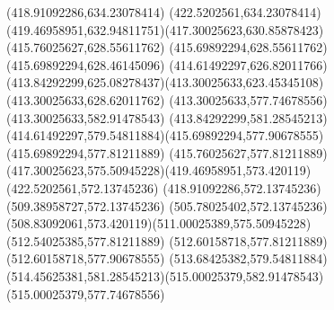 {{	\closepath
	\moveto(418.91092286,634.23078414)
	\lineto(422.5202561,634.23078414)
	\curveto(419.46958951,632.94811751)(417.30025623,630.85878423)(415.76025627,628.55611762)
	\lineto(415.69892294,628.55611762)
	\lineto(415.69892294,628.46145096)
	\curveto(414.61492297,626.82011766)(413.84292299,625.08278437)(413.30025633,623.45345108)
	\lineto(413.30025633,628.62011762)
	\closepath
	\moveto(413.30025633,577.74678556)
	\lineto(413.30025633,582.91478543)
	\curveto(413.84292299,581.28545213)(414.61492297,579.54811884)(415.69892294,577.90678555)
	\lineto(415.69892294,577.81211889)
	\lineto(415.76025627,577.81211889)
	\curveto(417.30025623,575.50945228)(419.46958951,573.420119)(422.5202561,572.13745236)
	\lineto(418.91092286,572.13745236)
	\closepath
	\moveto(509.38958727,572.13745236)
	\lineto(505.78025402,572.13745236)
	\curveto(508.83092061,573.420119)(511.00025389,575.50945228)(512.54025385,577.81211889)
	\lineto(512.60158718,577.81211889)
	\lineto(512.60158718,577.90678555)
	\curveto(513.68425382,579.54811884)(514.45625381,581.28545213)(515.00025379,582.91478543)
	\lineto(515.00025379,577.74678556)
	\closepath
}
}
